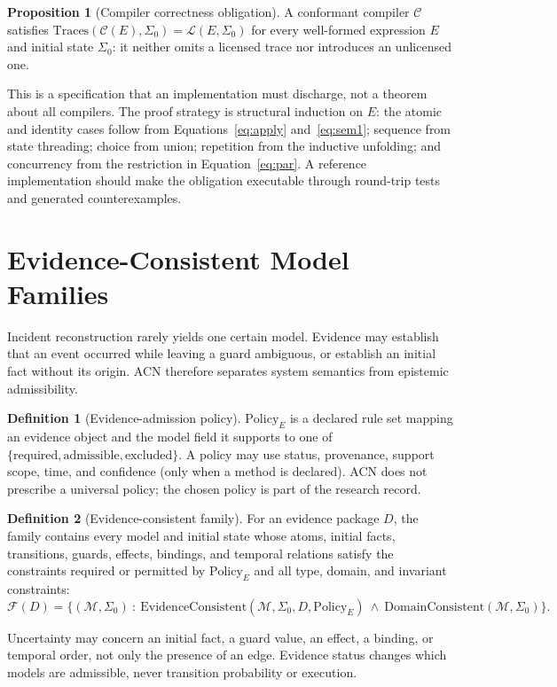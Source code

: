 \documentclass[11pt,letterpaper]{article}
\theoremstyle{definition}
\newtheorem{definition}{Definition}
\newtheorem{proposition}{Proposition}
\newcommand{\St}{\Sigma}
\newcommand{\Lang}{\mathcal{L}}
\newcommand{\Fam}{\mathcal{F}}
\newcommand{\Mod}{\mathcal{M}}
\begin{document}
\begin{proposition}[Compiler correctness obligation]
A conformant compiler $\mathcal{C}$ satisfies $\mathrm{Traces}(\mathcal{C}(E),\St_0)=\Lang(E,\St_0)$ for every well-formed expression $E$ and initial state $\St_0$: it neither omits a licensed trace nor introduces an unlicensed one.
\end{proposition}
This is a specification that an implementation must discharge, not a theorem about all compilers. The proof strategy is structural induction on $E$: the atomic and identity cases follow from Equations~\eqref{eq:apply} and~\eqref{eq:sem1}; sequence from state threading; choice from union; repetition from the inductive unfolding; and concurrency from the restriction in Equation~\eqref{eq:par}. A reference implementation should make the obligation executable through round-trip tests and generated counterexamples.

\section{Evidence-Consistent Model Families}\label{sec:evidence}

Incident reconstruction rarely yields one certain model. Evidence may establish that an event occurred while leaving a guard ambiguous, or establish an initial fact without its origin. ACN therefore separates system semantics from epistemic admissibility.

\begin{definition}[Evidence-admission policy]
$\mathrm{Policy}_E$ is a declared rule set mapping an evidence object and the model field it supports to one of $\{\text{required},\text{admissible},\text{excluded}\}$. A policy may use status, provenance, support scope, time, and confidence (only when a method is declared). ACN does not prescribe a universal policy; the chosen policy is part of the research record.
\end{definition}

\begin{definition}[Evidence-consistent family]
For an evidence package $D$, the family contains every model and initial state whose atoms, initial facts, transitions, guards, effects, bindings, and temporal relations satisfy the constraints required or permitted by $\mathrm{Policy}_E$ and all type, domain, and invariant constraints:
\begin{equation}\label{eq:family}
\Fam(D)=\{(\Mod,\St_0)\ :\ \mathrm{EvidenceConsistent}(\Mod,\St_0,D,\mathrm{Policy}_E)\ \wedge\ \mathrm{DomainConsistent}(\Mod,\St_0)\}.
\end{equation}
\end{definition}
Uncertainty may concern an initial fact, a guard value, an effect, a binding, or temporal order, not only the presence of an edge. Evidence status changes which models are admissible, never transition probability or execution.
\end{document}
